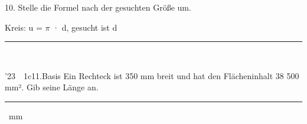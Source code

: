 \documentclass[11pt]{article}
\newcommand{\linie}[1]{\,{\color{black!45}\rule[-1pt]{#1}{0.4pt}}\,}
\newcommand{\pkt}{\textperiodcentered{}}
\begin{document}
\Needspace*{0.16\textheight}
\begin{pfaufg}{}{10.}{}
Stelle die Formel nach der gesuchten Größe um.
\par\smallskip
\par\noindent Kreis: u = $\pi$ · d, gesucht ist d\hfill\linie{30mm}
\par{}
\end{pfaufg}
\begin{pfaufg}{’23~\pkt{}~1c}{11.}{Basis}
Ein Rechteck ist 350 mm breit und hat den Flächeninhalt 38 500 mm². Gib seine Länge an.
\hfill\linie{30mm} mm
\end{pfaufg}
\end{document}
